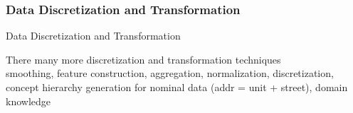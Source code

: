 \subsubsection{Data Discretization and Transformation}

\begin{frame}{Data Discretization and Transformation}

There many more discretization and transformation techniques \\

smoothing, feature construction, aggregation, normalization, discretization, concept hierarchy generation for nominal data (addr = unit + street), domain knowledge
\end{frame}